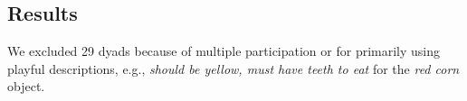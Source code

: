 \documentclass[10pt,letterpaper]{article}
\begin{document}
%
%


\subsection{Results}
We excluded 29 dyads because of multiple participation or for primarily using playful descriptions, e.g., \textit{should be yellow, must have teeth to eat} for the \textit{red corn} object.
\end{document}
